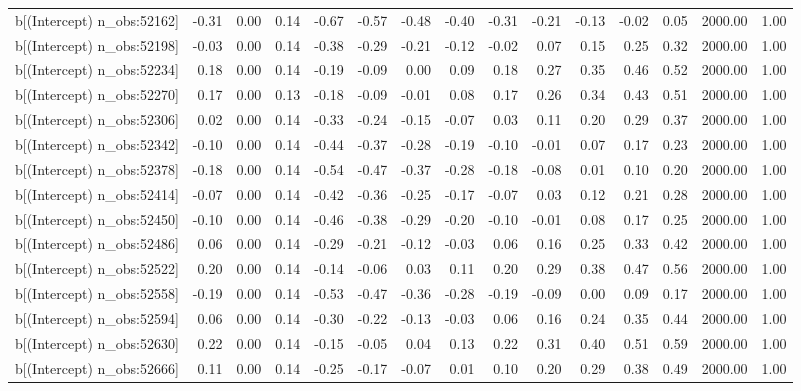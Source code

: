 \begin{table}[ht]
\begin{tabular}{rrrrrrrrrrrrrrr}
  b[(Intercept) n\_obs:52162] & -0.31 & 0.00 & 0.14 & -0.67 & -0.57 & -0.48 & -0.40 & -0.31 & -0.21 & -0.13 & -0.02 & 0.05 & 2000.00 & 1.00 \\ 
  b[(Intercept) n\_obs:52198] & -0.03 & 0.00 & 0.14 & -0.38 & -0.29 & -0.21 & -0.12 & -0.02 & 0.07 & 0.15 & 0.25 & 0.32 & 2000.00 & 1.00 \\ 
  b[(Intercept) n\_obs:52234] & 0.18 & 0.00 & 0.14 & -0.19 & -0.09 & 0.00 & 0.09 & 0.18 & 0.27 & 0.35 & 0.46 & 0.52 & 2000.00 & 1.00 \\ 
  b[(Intercept) n\_obs:52270] & 0.17 & 0.00 & 0.13 & -0.18 & -0.09 & -0.01 & 0.08 & 0.17 & 0.26 & 0.34 & 0.43 & 0.51 & 2000.00 & 1.00 \\ 
  b[(Intercept) n\_obs:52306] & 0.02 & 0.00 & 0.14 & -0.33 & -0.24 & -0.15 & -0.07 & 0.03 & 0.11 & 0.20 & 0.29 & 0.37 & 2000.00 & 1.00 \\ 
  b[(Intercept) n\_obs:52342] & -0.10 & 0.00 & 0.14 & -0.44 & -0.37 & -0.28 & -0.19 & -0.10 & -0.01 & 0.07 & 0.17 & 0.23 & 2000.00 & 1.00 \\ 
  b[(Intercept) n\_obs:52378] & -0.18 & 0.00 & 0.14 & -0.54 & -0.47 & -0.37 & -0.28 & -0.18 & -0.08 & 0.01 & 0.10 & 0.20 & 2000.00 & 1.00 \\ 
  b[(Intercept) n\_obs:52414] & -0.07 & 0.00 & 0.14 & -0.42 & -0.36 & -0.25 & -0.17 & -0.07 & 0.03 & 0.12 & 0.21 & 0.28 & 2000.00 & 1.00 \\ 
  b[(Intercept) n\_obs:52450] & -0.10 & 0.00 & 0.14 & -0.46 & -0.38 & -0.29 & -0.20 & -0.10 & -0.01 & 0.08 & 0.17 & 0.25 & 2000.00 & 1.00 \\ 
  b[(Intercept) n\_obs:52486] & 0.06 & 0.00 & 0.14 & -0.29 & -0.21 & -0.12 & -0.03 & 0.06 & 0.16 & 0.25 & 0.33 & 0.42 & 2000.00 & 1.00 \\ 
  b[(Intercept) n\_obs:52522] & 0.20 & 0.00 & 0.14 & -0.14 & -0.06 & 0.03 & 0.11 & 0.20 & 0.29 & 0.38 & 0.47 & 0.56 & 2000.00 & 1.00 \\ 
  b[(Intercept) n\_obs:52558] & -0.19 & 0.00 & 0.14 & -0.53 & -0.47 & -0.36 & -0.28 & -0.19 & -0.09 & 0.00 & 0.09 & 0.17 & 2000.00 & 1.00 \\ 
  b[(Intercept) n\_obs:52594] & 0.06 & 0.00 & 0.14 & -0.30 & -0.22 & -0.13 & -0.03 & 0.06 & 0.16 & 0.24 & 0.35 & 0.44 & 2000.00 & 1.00 \\ 
  b[(Intercept) n\_obs:52630] & 0.22 & 0.00 & 0.14 & -0.15 & -0.05 & 0.04 & 0.13 & 0.22 & 0.31 & 0.40 & 0.51 & 0.59 & 2000.00 & 1.00 \\ 
  b[(Intercept) n\_obs:52666] & 0.11 & 0.00 & 0.14 & -0.25 & -0.17 & -0.07 & 0.01 & 0.10 & 0.20 & 0.29 & 0.38 & 0.49 & 2000.00 & 1.00 \\ 

\end{tabular}
\end{table}
